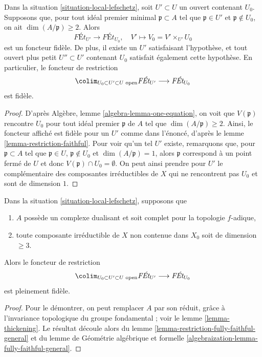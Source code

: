 \begin{lemma}
\label{lemma-faithful-general}
Dans la situation \ref{situation-local-lefschetz}, soit $U' \subset U$
un ouvert contenant $U_0$. Supposons que, pour tout idéal premier minimal $\mathfrak p \subset A$
tel que $\mathfrak p \in U'$ et $\mathfrak p \not \in U_0$, on ait
$\dim(A/\mathfrak p) \geq 2$. Alors
$$
\textit{F\'Et}_{U'} \longrightarrow \textit{F\'Et}_{U_0},\quad
V' \longmapsto V_0 = V' \times_{U'} U_0
$$
est un foncteur fidèle. De plus, il existe un $U'$ satisfaisant
l'hypothèse, et tout ouvert plus petit $U'' \subset U'$ contenant
$U_0$ satisfait également cette hypothèse. En particulier, le
foncteur de restriction
$$
\colim_{U_0 \subset U' \subset U\text{ open}} \textit{F\'Et}_{U'}
\longrightarrow
\textit{F\'Et}_{U_0}
$$
est fidèle.
\end{lemma}

\begin{proof}
D'après Algèbre, lemme \ref{algebra-lemma-one-equation},
on voit que $V(\mathfrak p)$ rencontre $U_0$ pour
tout idéal premier $\mathfrak p$ de $A$ tel que $\dim(A/\mathfrak p) \geq 2$.
Ainsi, le foncteur affiché est fidèle pour un $U'$ comme dans l'énoncé,
d'après le lemme \ref{lemma-restriction-faithful}.
Pour voir qu'un tel $U'$ existe, remarquons que, pour
$\mathfrak p \subset A$ tel que $\mathfrak p \in U$,
$\mathfrak p \not \in U_0$ et $\dim(A/\mathfrak p) = 1$,
alors $\mathfrak p$ correspond à un point fermé de $U$
et donc $V(\mathfrak p) \cap U_0 = \emptyset$.
On peut ainsi prendre pour $U'$ le complémentaire des composantes
irréductibles de $X$ qui ne rencontrent pas $U_0$ et sont de dimension $1$.
\end{proof}

\begin{lemma}
\label{lemma-fully-faithful-general-better}
Dans la situation \ref{situation-local-lefschetz}, supposons que
\begin{enumerate}
\item $A$ possède un complexe dualisant et soit complet pour la topologie $f$-adique,
\item toute composante irréductible de $X$ non contenue dans $X_0$
soit de dimension $\geq 3$.
\end{enumerate}
Alors le foncteur de restriction
$$
\colim_{U_0 \subset U' \subset U\text{ open}} \textit{F\'Et}_{U'}
\longrightarrow
\textit{F\'Et}_{U_0}
$$
est pleinement fidèle.
\end{lemma}

\begin{proof}
Pour le démontrer, on peut remplacer $A$ par son réduit, grâce à l'invariance topologique
du groupe fondamental ; voir le lemme \ref{lemma-thickening}.
Le résultat découle alors du
lemme \ref{lemma-restriction-fully-faithful-general}
et du lemme de Géométrie algébrique et formelle
\ref{algebraization-lemma-fully-faithful-general}.
\end{proof}

